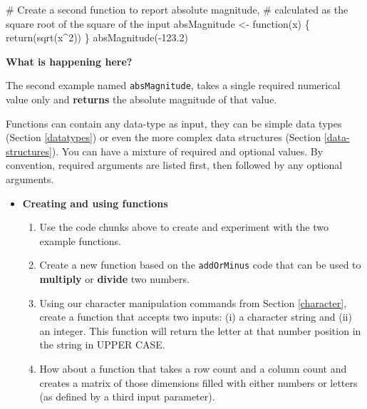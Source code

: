 \documentclass[a4paper]{book}
\newenvironment{Shaded}{}{}
\newcommand{\KeywordTok}[1]{\textcolor[rgb]{0.00,0.00,1.00}{{#1}}}
\newcommand{\DecValTok}[1]{{#1}}
\newcommand{\FloatTok}[1]{{#1}}
\newcommand{\StringTok}[1]{\textcolor[rgb]{0.00,0.50,0.50}{{#1}}}
\newcommand{\CommentTok}[1]{\textcolor[rgb]{0.00,0.50,0.00}{{#1}}}
\newcommand{\NormalTok}[1]{{#1}}
\newlength{\leftbarwidth}
\newlength{\leftbarsep}
\newcommand*{\leftbarcolorcmd}{\color{darkgray}}%
\renewenvironment{leftbar}{%
    \def\FrameCommand{{\leftbarcolorcmd{\vrule width \leftbarwidth\relax\hspace {\leftbarsep}}}}%
    \MakeFramed {\advance \hsize -\width \FrameRestore }%
}{%
    \endMakeFramed
}
\renewenvironment{Shaded}
{\vspace{0em}\begin{leftbar}\begin{snugshade}}
{\end{snugshade}\end{leftbar}\vspace{0pt}}
\newenvironment{rmdblock}[1]
  {\vspace{1.5em}\begin{shaded*}
  \begin{itemize}
  \renewcommand{\labelitemi}{
    \raisebox{-.7\height}[0pt][0pt]{
      {\setkeys{Gin}{width=3em,keepaspectratio}\texttt{[image: images/\#1]}}
    }
  }
  \item
  }
  {
  \end{itemize}
  \end{shaded*}
  }
\newenvironment{rmdexercise}
  {\begin{rmdblock}{exercise}}
  {\end{rmdblock}}
\begin{document}
\begin{Shaded}
\begin{Highlighting}[]
\CommentTok{# Create a second function to report absolute magnitude,}
\CommentTok{# calculated as the square root of the square of the input}
\NormalTok{absMagnitude <-}\StringTok{ }\NormalTok{function(x) \{}
  \KeywordTok{return}\NormalTok{(}\KeywordTok{sqrt}\NormalTok{(x^}\DecValTok{2}\NormalTok{))}
\NormalTok{\}}
\KeywordTok{absMagnitude}\NormalTok{(-}\FloatTok{123.2}\NormalTok{)}
\end{Highlighting}
\end{Shaded}

\textbf{What is happening here?}

The second example named \texttt{absMagnitude}, takes a single required
numerical value only and \textbf{returns} the absolute magnitude of that
value.

Functions can contain any data-type as input, they can be simple data
types (Section \ref{datatypes}) or even the more complex data structures
(Section \ref{data-structures}). You can have a mixture of required and
optional values. By convention, required arguments are listed first,
then followed by any optional arguments.

\begin{rmdexercise}
\textbf{Creating and using functions}

\begin{enumerate}
\def\labelenumi{\arabic{enumi}.}
\item
  Use the code chunks above to create and experiment with the two
  example functions.
\item
  Create a new function based on the \texttt{addOrMinus} code that can
  be used to \textbf{multiply} or \textbf{divide} two numbers.
\item
  Using our character manipulation commands from Section
  \ref{character}, create a function that accepts two inputs: (i) a
  character string and (ii) an integer. This function will return the
  letter at that number position in the string in UPPER CASE.
\item
  How about a function that takes a row count and a column count and
  creates a matrix of those dimensions filled with either numbers or
  letters (as defined by a third input parameter).
\end{enumerate}
\end{rmdexercise}
\end{document}
